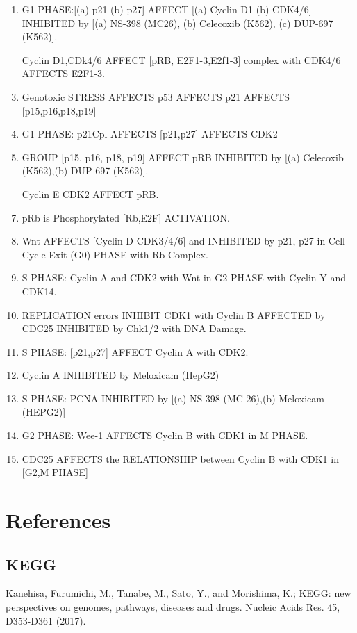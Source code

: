 \begin{enumerate}
	\item G1 PHASE:[(a) p21 (b) p27] AFFECT [(a) Cyclin D1 (b) CDK4/6] INHIBITED by [(a) NS-398 (MC26), (b) Celecoxib (K562), (c) DUP-697 (K562)]. \cite{key4000}
	\item [Cyclin D1,CDk4/6] AFFECT [pRB, E2F1-3,E2f1-3] complex with CDK4/6 AFFECTS E2F1-3. \cite{key4000}
	\item Genotoxic STRESS AFFECTS p53 AFFECTS p21 AFFECTS [p15,p16,p18,p19] \cite{key4000}
	\item G1 PHASE: p21Cpl AFFECTS [p21,p27] AFFECTS CDK2 \cite{key4000}
	\item GROUP [p15, p16, p18, p19] AFFECT pRB INHIBITED by [(a) Celecoxib (K562),(b) DUP-697 (K562)]. \cite{key4000} 
	\item [Cyclin E CDK2] AFFECT pRB.  \cite{key4000}
	\item pRb is Phosphorylated [Rb,E2F] ACTIVATION. \cite{key4000}
	\item Wnt AFFECTS [Cyclin D CDK3/4/6] and INHIBITED by p21, p27 in Cell Cycle Exit (G0) PHASE with Rb Complex. \cite{key4000}
	\item S PHASE: Cyclin A and CDK2 with Wnt in G2 PHASE with Cyclin Y and CDK14.  \cite{key4000}
	\item REPLICATION errors INHIBIT CDK1 with Cyclin B AFFECTED by CDC25 INHIBITED by Chk1/2 with DNA Damage. \cite{key4000}
	\item S PHASE: [p21,p27] AFFECT Cyclin A with CDK2. \cite{key4000}
	\item Cyclin A INHIBITED by Meloxicam (HepG2) \cite{key4000}
	\item S PHASE: PCNA INHIBITED by [(a) NS-398 (MC-26),(b) Meloxicam (HEPG2)] \cite{key4000}
	\item G2 PHASE: Wee-1 AFFECTS Cyclin B with CDK1 in M PHASE.  \cite{key4000}
	\item CDC25 AFFECTS the RELATIONSHIP between Cyclin B with CDK1 in [G2,M PHASE] \cite{key4000}	
\end{enumerate}

\section{References}

\subsection{KEGG}

 Kanehisa, Furumichi, M., Tanabe, M., Sato, Y., and Morishima, K.; 
\newblock KEGG: new perspectives on genomes, pathways, diseases and drugs. 
\newblock Nucleic Acids Res. 45, D353-D361 (2017).

